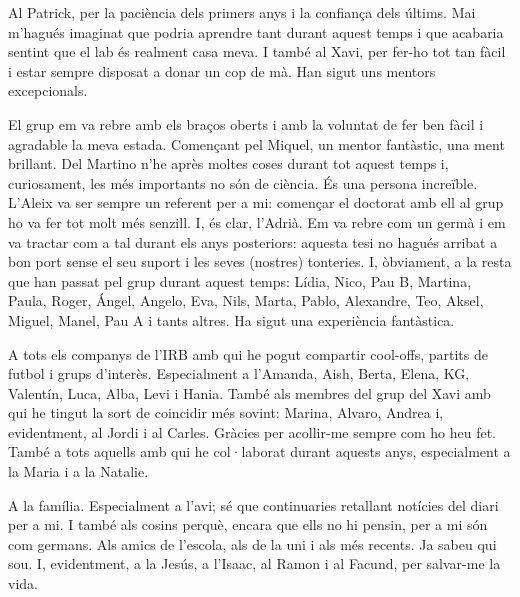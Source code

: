 

Al Patrick, per la paciència dels primers anys i la confiança dels últims. Mai m’hagués imaginat que podria aprendre tant durant aquest temps i que acabaria sentint que el lab és realment casa meva. I també al Xavi, per fer-ho tot tan fàcil i estar sempre disposat a donar un cop de mà. Han sigut uns mentors excepcionals.

El grup em va rebre amb els braços oberts i amb la voluntat de fer ben fàcil i agradable la meva estada. Començant pel Miquel, un mentor fantàstic, una ment brillant. Del Martino n’he après moltes coses durant tot aquest temps i, curiosament, les més importants no són de ciència. És una persona increïble. L’Aleix va ser sempre un referent per a mi: començar el doctorat amb ell al grup ho va fer tot molt més senzill. I, és clar, l’Adrià. Em va rebre com un germà i em va tractar com a tal durant els anys posteriors: aquesta tesi no hagués arribat a bon port sense el seu suport i les seves (nostres) tonteries. I, òbviament, a la resta que han passat pel grup durant aquest temps: Lídia, Nico, Pau B, Martina, Paula, Roger, Ángel, Angelo, Eva, Nils, Marta, Pablo, Alexandre, Teo, Aksel, Miguel, Manel, Pau A i tants altres. Ha sigut una experiència fantàstica. 

A tots els companys de l’IRB amb qui he pogut compartir cool-offs, partits de futbol i grups d’interès. Especialment a l’Amanda, Aish, Berta, Elena, KG, Valentín, Luca, Alba, Levi i Hania. També als membres del grup del Xavi amb qui he tingut la sort de coincidir més sovint: Marina, Alvaro, Andrea i, evidentment, al Jordi i al Carles. Gràcies per acollir-me sempre com ho heu fet. També a tots aquells amb qui he col·laborat durant aquests anys, especialment a la Maria i a la Natalie. 

A la família. Especialment a l’avi; sé que continuaries retallant notícies del diari per a mi. I també als cosins perquè, encara que ells no hi pensin, per a mi són com germans. Als amics de l’escola, als de la uni i als més recents. Ja sabeu qui sou. I, evidentment, a la Jesús, a l’Isaac, al Ramon i al Facund, per salvar-me la vida. 

